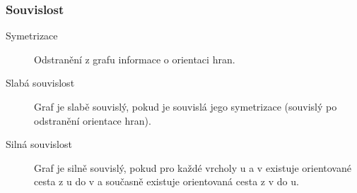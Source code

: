     \subsubsection{Souvislost}
      \begin{description}
        \item[Symetrizace] Odstranění z grafu informace o orientaci hran.
        \item[Slabá souvislost] Graf je slabě souvislý, pokud je souvislá jego symetrizace (souvislý po odstranění orientace hran).
        \item[Silná souvislost] Graf je silně souvislý, pokud pro každé vrcholy u a v existuje orientované cesta z u do v a současně existuje orientovaná cesta z v do u.
      \end{description}
